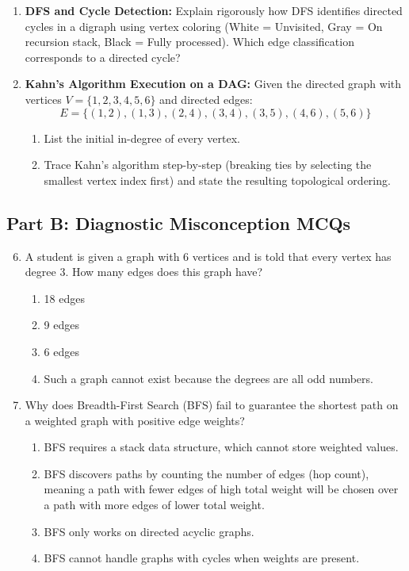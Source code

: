\begin{enumerate}
    \item \textbf{DFS and Cycle Detection:}
    Explain rigorously how DFS identifies directed cycles in a digraph using vertex coloring (White = Unvisited, Gray = On recursion stack, Black = Fully processed). Which edge classification corresponds to a directed cycle?

    \item \textbf{Kahn's Algorithm Execution on a DAG:}
    Given the directed graph with vertices $V = \{1, 2, 3, 4, 5, 6\}$ and directed edges:
    \begin{equation}
    E = \{(1, 2), (1, 3), (2, 4), (3, 4), (3, 5), (4, 6), (5, 6)\}
    \end{equation}
    \begin{enumerate}
        \item List the initial in-degree of every vertex.
        \item Trace Kahn's algorithm step-by-step (breaking ties by selecting the smallest vertex index first) and state the resulting topological ordering.
    \end{enumerate}
\end{enumerate}

\subsection*{Part B: Diagnostic Misconception MCQs}

\begin{enumerate}
    \setcounter{enumi}{5}
    \item A student is given a graph with 6 vertices and is told that every vertex has degree 3. How many edges does this graph have?
    \begin{enumerate}
        \item 18 edges
        \item 9 edges
        \item 6 edges
        \item Such a graph cannot exist because the degrees are all odd numbers.
    \end{enumerate}

    \item Why does Breadth-First Search (BFS) fail to guarantee the shortest path on a weighted graph with positive edge weights?
    \begin{enumerate}
        \item BFS requires a stack data structure, which cannot store weighted values.
        \item BFS discovers paths by counting the number of edges (hop count), meaning a path with fewer edges of high total weight will be chosen over a path with more edges of lower total weight.
        \item BFS only works on directed acyclic graphs.
        \item BFS cannot handle graphs with cycles when weights are present.
    \end{enumerate}
\end{enumerate}
